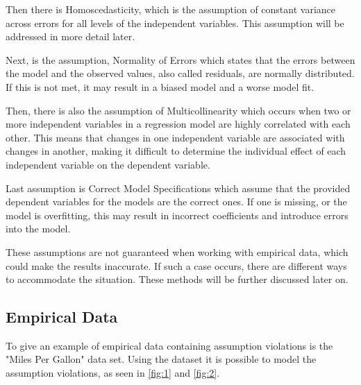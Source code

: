 \noindent Then there is Homoscedasticity, which is the assumption of constant variance across errors for all levels of the independent variables. This assumption will be addressed in more detail later. \newline

\noindent Next, is the assumption, Normality of Errors which states that the errors between the model and the observed values, also called residuals, are normally distributed. If this is not met, it may result in a biased model and a worse model fit. \newline


\noindent Then, there is also the assumption of Multicollinearity which occurs when two or more independent variables in a regression model are highly correlated with each other. This means that changes in one independent variable are associated with changes in another, making it difficult to determine the individual effect of each independent variable on the dependent variable. \newline

\noindent Last assumption is Correct Model Specifications which assume that the provided dependent variables for the models are the correct ones. If one is missing, or the model is overfitting, this may result in incorrect coefficients and introduce errors into the model. \newline

\noindent These assumptions are not guaranteed when working with empirical data, which could make the results inaccurate. 
If such a case occurs, there are different ways to accommodate the situation. These methods will be further discussed later on. \newline 

 

\subsection{Empirical Data}
To give an example of empirical data containing assumption violations is the "Miles Per Gallon" data set. Using the dataset it is possible to model the assumption violations, as seen in \autoref{fig:1} and \autoref{fig:2}.
\newline

